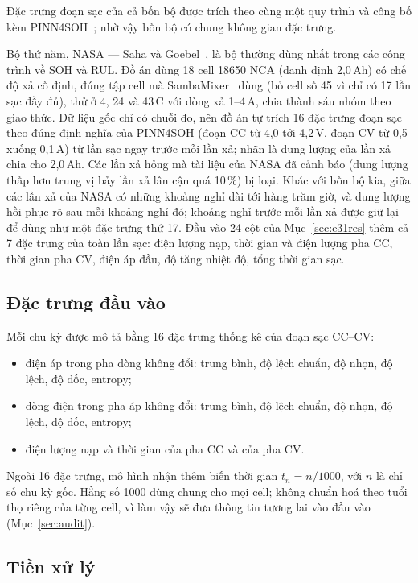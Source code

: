 \documentclass[12pt,a4paper,oneside]{report}
\theoremstyle{plain}
\theoremstyle{definition}
\begin{document}
Đặc trưng đoạn sạc của cả bốn bộ được trích theo cùng một quy trình và công bố kèm PINN4SOH~\cite{wang2024};
nhờ vậy bốn bộ có chung không gian đặc trưng.

Bộ thứ năm, NASA --- Saha và Goebel~\cite{saha2007nasa}, là bộ thường dùng nhất trong các công trình về SOH
và RUL. Đồ án dùng 18 cell 18650 NCA (danh định 2,0\,Ah) có chế độ xả cố định, đúng tập cell mà
SambaMixer~\cite{olalde2024samba} dùng (bỏ cell số 45 vì chỉ có 17 lần sạc đầy đủ), thử ở 4, 24 và 43\,\textdegree C
với dòng xả 1--4\,A, chia thành sáu nhóm theo giao thức. Dữ liệu gốc chỉ có chuỗi đo, nên đồ án tự trích 16 đặc trưng
đoạn sạc theo đúng định nghĩa của PINN4SOH (đoạn CC từ 4,0 tới 4,2\,V, đoạn CV từ 0,5 xuống 0,1\,A) từ lần sạc ngay
trước mỗi lần xả; nhãn là dung lượng của lần xả chia cho 2,0\,Ah. Các lần xả hỏng mà tài liệu của NASA đã cảnh báo
(dung lượng thấp hơn trung vị bảy lần xả lân cận quá 10\,\%) bị loại. Khác với bốn bộ kia, giữa các lần xả của NASA
có những khoảng nghỉ dài tới hàng trăm giờ, và dung lượng hồi phục rõ sau mỗi khoảng nghỉ đó; khoảng nghỉ trước mỗi lần
xả được giữ lại để dùng như một đặc trưng thứ 17. Đầu vào 24 cột của Mục~\ref{sec:e31res} thêm cả 7 đặc trưng của toàn lần sạc: điện lượng nạp, thời gian và điện lượng pha CC, thời gian pha CV, điện áp đầu, độ tăng nhiệt độ, tổng thời gian sạc.

\subsection{Đặc trưng đầu vào}

Mỗi chu kỳ được mô tả bằng 16 đặc trưng thống kê của đoạn sạc CC--CV:
\begin{itemize}
\item điện áp trong pha dòng không đổi: trung bình, độ lệch chuẩn, độ nhọn, độ lệch, độ dốc, entropy;
\item dòng điện trong pha áp không đổi: trung bình, độ lệch chuẩn, độ nhọn, độ lệch, độ dốc, entropy;
\item điện lượng nạp và thời gian của pha CC và của pha CV.
\end{itemize}
Ngoài 16 đặc trưng, mô hình nhận thêm biến thời gian $t_n = n/1000$, với $n$ là chỉ số chu kỳ gốc. Hằng số
1000 dùng chung cho mọi cell; không chuẩn hoá theo tuổi thọ riêng của từng cell, vì làm vậy sẽ đưa thông tin
tương lai vào đầu vào (Mục~\ref{sec:audit}).

\subsection{Tiền xử lý}
\end{document}
